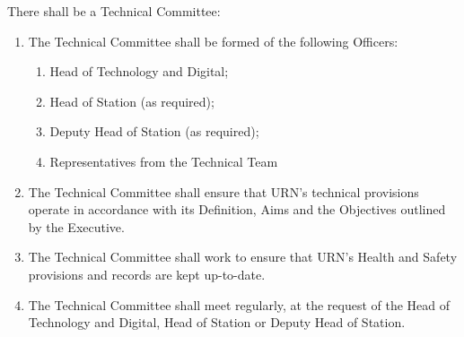 \item There shall be a Technical Committee:
\begin{enumerate}[label*=\arabic*.]
    \item The Technical Committee shall be formed of the following Officers:
          \begin{enumerate}[label*=\arabic*.]
              \item Head of Technology and Digital;
              \item Head of Station (as required);
              \item Deputy Head of Station (as required);
              \item Representatives from the Technical Team
          \end{enumerate}
    \item The Technical Committee shall ensure that URN's technical provisions operate in accordance with its Definition, Aims and the Objectives outlined by the Executive.
    \item The Technical Committee shall work to ensure that URN's Health and Safety provisions and records are kept up-to-date.
    \item The Technical Committee shall meet regularly, at the request of the Head of Technology and Digital, Head of Station or Deputy Head of Station.
\end{enumerate}
